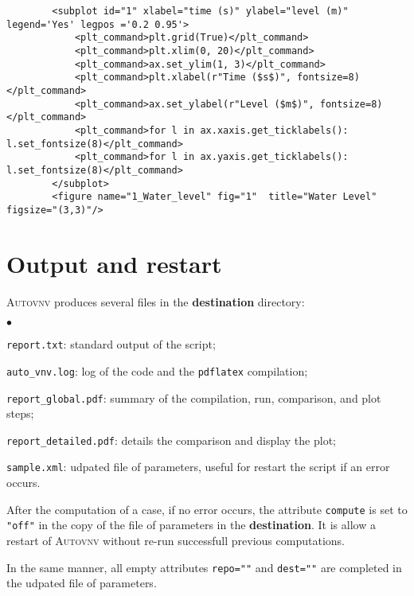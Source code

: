 \documentclass[a4paper,10pt,twoside]{article}
\begin{document}
\begin{verbatim}
        <subplot id="1" xlabel="time (s)" ylabel="level (m)" legend='Yes' legpos ='0.2 0.95'>
            <plt_command>plt.grid(True)</plt_command>
            <plt_command>plt.xlim(0, 20)</plt_command>
            <plt_command>ax.set_ylim(1, 3)</plt_command>
            <plt_command>plt.xlabel(r"Time ($s$)", fontsize=8)</plt_command>
            <plt_command>ax.set_ylabel(r"Level ($m$)", fontsize=8)</plt_command>
            <plt_command>for l in ax.xaxis.get_ticklabels(): l.set_fontsize(8)</plt_command>
            <plt_command>for l in ax.yaxis.get_ticklabels(): l.set_fontsize(8)</plt_command>
        </subplot>
        <figure name="1_Water_level" fig="1"  title="Water Level" figsize="(3,3)"/>
\end{verbatim}



\section{Output and restart}

\textsc{Autovnv} produces several files in the \textbf{destination} directory:
\begin{list}{$\bullet$}{}
\item \texttt{report.txt}: standard output of the script;
\item \texttt{auto\_vnv.log}: log of the code and the \texttt{pdflatex} compilation;
\item \texttt{report\_global.pdf}: summary of the compilation, run, comparison, and plot steps;
\item \texttt{report\_detailed.pdf}: details the comparison and display the plot;
\item \texttt{sample.xml}: udpated file of parameters, useful for restart the script if an error occurs.
\end{list}

After the computation of a case, if no error occurs, the attribute \texttt{compute}
is set to \texttt{"off"} in the copy of the file of parameters in
the \textbf{destination}. It is allow a restart
of \textsc{Autovnv} without re-run successfull previous computations.

In the same manner, all empty attributes \texttt{repo=""} and \texttt{dest=""}
are completed in the udpated file of parameters.

%
\end{document}
